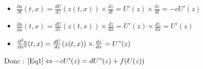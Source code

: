 \documentclass[a4paper,11pt]{article}
\begin{document}
{\setlength{\baselineskip}{1.8\baselineskip}
\large{
\begin{itemize}[label=$\bullet$]
	\item $\frac{\partial u}{\partial t}(t,x)=\frac{dU}{dz}(z(t,x))\times\frac{dz}{dt}=U'(z)\times \frac{dz}{dt}=-c U'(z)$
    \item $\frac{\partial u}{\partial x}(t,x)=\frac{dU}{dz}(z(t,x))\times\frac{dz}{dx}=U'(z)\times \frac{dz}{dx}=U'(z)$
  	\item $\frac{\partial^2 u}{\partial x^2}(t,x)=\frac{d\dot U}{dz}(z(t,x))\times\frac{dz}{dx}=U"(z)$
\end{itemize}
}
\par}
Donc : $\eqref{Eq1}\Leftrightarrow -c U'(z)=d U"(z)+f(U(z))$
\end{document}
